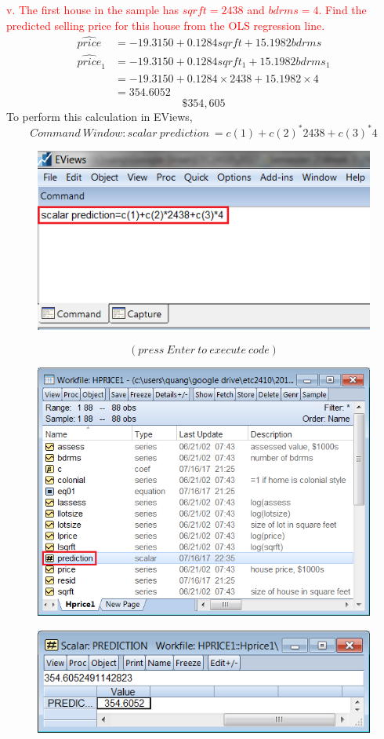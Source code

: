 \documentclass[12pt]{report}
\begin{document}
\noindent \textcolor{red}
{
	v. The first house in the sample has $sqrft=2438$ and $bdrms=4$. Find the predicted selling price for this house from the OLS regression line.
}
\begin{align*}
\widehat{price} &= -19.3150 + 0.1284sqrft + 15.1982bdrms \\
\widehat{price}_1 &= -19.3150 + 0.1284sqrft_1 + 15.1982bdrms_1 \\
&= -19.3150+0.1284 \times 2438+15.1982 \times 4 \\
&= 354.6052
\end{align*}
$$\$354,605$$
\noindent To perform this calculation in EViews,
$$Command\ Window: scalar\ prediction\ = c(1) + c(2)^{*}2438 + c(3)^{*}4$$
\begin{figure}[H]
	\centering
	\includegraphics{q3_2}
\end{figure}
\vspace{-\baselineskip}
$$(press\ Enter\ to\ execute\ code)$$
\begin{figure}[H]
	\centering
	\includegraphics{q3_3}
\end{figure}
\vspace{-\baselineskip}
\begin{figure}[H]
	\centering
	\includegraphics{q3_4}
\end{figure}
\end{document}
